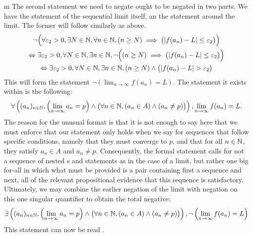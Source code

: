 \documentclass[11pt]{article}
\begin{document}
\begin{my proof}{m}
The second statement we need to negate ought to be negated in two parts. We have the statement of the sequential limit itself, an the statement around the limit. The former will follow similarly as above. \begin{gather*}
\neg \Big( \forall \varepsilon_2 > 0, \exists N \in \mathbb{N}, \forall n \in \mathbb{N}, (n \ge N) \implies \big( |f(a_n) - L| \le \varepsilon_2  \big)\Big) \\
\Leftrightarrow \exists \varepsilon_2 > 0, \forall N \in \mathbb{N}, \exists n \in \mathbb{N}, \neg \Big( (n \ge N) \implies \big(|f(a_n) - L| \le \varepsilon_2  \big) \Big) \\
\Leftrightarrow \exists \varepsilon_2 > 0, \forall N \in \mathbb{N}, \exists n \in \mathbb{N}, (n \ge N) \wedge \big( |f(a_n) - L| > \varepsilon_2 \big)
\end{gather*}
This will form the statement $\neg \left( \lim_{n \to \infty} f(a_n) = L \right)$. The statement it exists within is the following: \begin{gather*}
\forall \left( (a_n)_{n\in \mathbb{N}}, \left( \lim_{n \to \infty} a_n = p\right) \wedge \big( \forall n \in \mathbb{N}, (a_n \in A) \wedge (a_n \neq p) \big)\right), \lim_{n \to \infty} f(a_n) = L.
\end{gather*}
The reason for the unusual format is that it is not enough to say here that  we must enforce that our statement only holds when we say  for sequences that follow specific conditions, namely that they must converge to $p$, and that for all $n \in \mathbb{N}$, they satisfy $a_n \in A$ and $a_n \neq p$. Consequently, the formal statement calls for not a sequence of nested s and  statements as in the case of a limit, but rather one big for-all in which what must be provided is a pair containing first a sequence and next, all of the relevant propositional evidence that this sequence is satisfactory. Ultimately, we may combine the earlier negation of the limit with negation on this one singular quantifier to obtain the total negative: \begin{gather*}
\exists \left( (a_n)_{n\in \mathbb{N}}, \left( \lim_{n \to \infty} a_n = p\right) \wedge \big( \forall n \in \mathbb{N}, (a_n \in A) \wedge (a_n \neq p) \big)\right), \neg \left( \lim_{n \to \infty} f(a_n) = L \right)
\end{gather*}
This statement can now be read .


\end{my proof}
\end{document}
